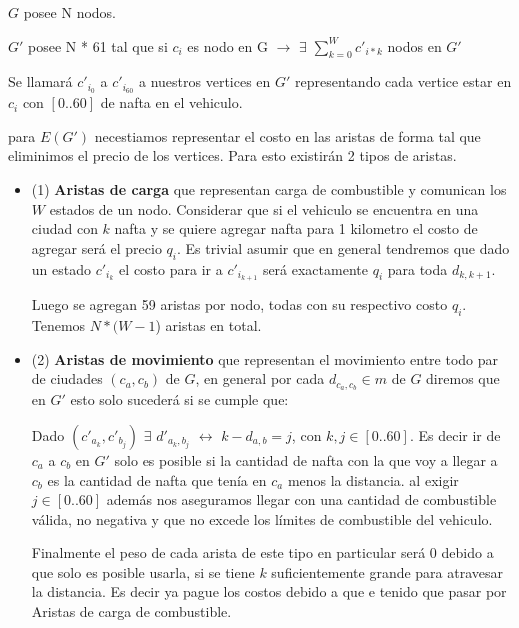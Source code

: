 \documentclass[12pt]{article}
\begin{document}
$G$ posee  N nodos. 

$G'$ posee N * 61 tal que si $c_i$ es nodo en G $\rightarrow$ $\exists$ $\sum_{k=0}^{W} c'_{i * k}$ nodos en $G'$

Se llamará $c'_{i_0}$ a $c'_{i_{60}}$ a nuestros vertices en $G'$ representando cada vertice estar en $c_i$ con $[0..60]$ de nafta en el vehiculo. 

para $E(G')$ necestiamos representar el costo en las aristas de forma tal que eliminimos el precio de los vertices. Para esto existirán 2 tipos de aristas.

\begin{itemize}
	\item (1) \textbf{Aristas de carga} que representan carga de combustible y comunican los $W$ estados de un nodo. Considerar que si el vehiculo se encuentra en una ciudad con $k$ nafta y se quiere agregar nafta para 1 kilometro el costo de agregar será el precio $q_i$. Es trivial asumir que en general tendremos que dado un estado $c'_{i_k}$ el costo para ir a $c'_{i_{k+1}}$ será exactamente $q_i$ para toda $d_{k,k+1}$.
	
	Luego se agregan 59 aristas por nodo, todas con su respectivo costo $q_i$. Tenemos $N * (W - 1$) aristas en total.
\end{itemize}



\begin{itemize}
	\item (2) \textbf{Aristas de movimiento} que representan el movimiento entre todo par de ciudades $(c_a, c_b)$ de $G$, en general por cada $d_{c_a,c_b} \in m$ de $G$ diremos que en $G'$ esto solo sucederá si se cumple que:
	
	Dado $(c'_{a_k}, c'_{b_j})$ $\exists$ $d'_{a_k,b_j}$ $\leftrightarrow$  $k - d_{a,b} = j$, con $k,j \in [0..60]$. Es decir ir de $c_a$ a $c_b$ en $G'$ solo es posible si la cantidad de nafta con la que voy a llegar a $c_b$ es la cantidad de nafta que tenía en $c_a$ menos la distancia. al exigir $j \in [0..60]$ además nos aseguramos llegar con una cantidad de combustible válida, no negativa y que no excede los límites de combustible del vehiculo.
	 
	Finalmente el peso de cada arista de este tipo en particular será $0$ debido a que solo es posible usarla, si se tiene $k$ suficientemente grande para atravesar la distancia. Es decir ya pague los costos debido a que e tenido que pasar por Aristas de carga de combustible.
\end{itemize}
\end{document}
